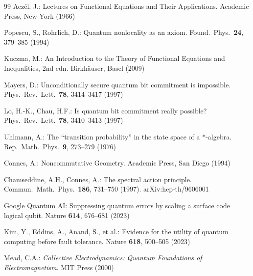 \documentclass[11pt]{article}
\theoremstyle{remark}
\begin{document}
\begin{thebibliography}{99}
 Acz\'el, J.: Lectures on Functional Equations and Their Applications. Academic Press, New York (1966)

 Popescu, S., Rohrlich, D.: Quantum nonlocality as an axiom. Found.\ Phys.\ \textbf{24}, 379--385 (1994)

 Kuczma, M.: An Introduction to the Theory of Functional Equations and Inequalities, 2nd edn. Birkh\"auser, Basel (2009)

 Mayers, D.: Unconditionally secure quantum bit commitment is impossible. Phys.\ Rev.\ Lett.\ \textbf{78}, 3414--3417 (1997)

 Lo, H.-K., Chau, H.F.: Is quantum bit commitment really possible? Phys.\ Rev.\ Lett.\ \textbf{78}, 3410--3413 (1997)

 Uhlmann, A.: The ``transition probability'' in the state space of a $*$-algebra. Rep.\ Math.\ Phys.\ \textbf{9}, 273--279 (1976)

 Connes, A.: Noncommutative Geometry. Academic Press, San Diego (1994)

 Chamseddine, A.H., Connes, A.: The spectral action principle. Commun.\ Math.\ Phys.\ \textbf{186}, 731--750 (1997). arXiv:hep-th/9606001

 Google Quantum AI: Suppressing quantum errors by scaling a surface code logical qubit. Nature \textbf{614}, 676--681 (2023)

 Kim, Y., Eddins, A., Anand, S., et al.: Evidence for the utility of quantum computing before fault tolerance. Nature \textbf{618}, 500--505 (2023)

 Mead, C.A.: \textit{Collective Electrodynamics: Quantum Foundations of Electromagnetism}. MIT Press (2000)

\end{thebibliography}
\end{document}
